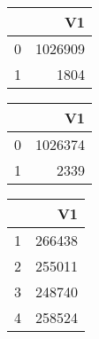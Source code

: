 \bigskip\bigskip
\centering
\begin{tabular}{rr}
  \hline
 & V1 \\ 
  \hline
0 & 1026909 \\ 
  1 & 1804 \\ 
   \hline
\end{tabular}

\bigskip\bigskip
\centering
\begin{tabular}{rr}
  \hline
 & V1 \\ 
  \hline
0 & 1026374 \\ 
  1 & 2339 \\ 
   \hline
\end{tabular}

\bigskip\bigskip
\centering
\begin{tabular}{rr}
  \hline
 & V1 \\ 
  \hline
1 & 266438 \\ 
  2 & 255011 \\ 
  3 & 248740 \\ 
  4 & 258524 \\ 
   \hline
\end{tabular}

